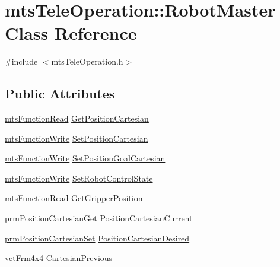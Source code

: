 \hypertarget{classmts_tele_operation_1_1_robot_master}{\section{mts\-Tele\-Operation\-:\-:Robot\-Master Class Reference}
\label{classmts_tele_operation_1_1_robot_master}
}


{\ttfamily \#include $<$mts\-Tele\-Operation.\-h$>$}

\subsection*{Public Attributes}
\begin{DoxyCompactItemize}
\item 
\hyperlink{classmts_function_read}{mts\-Function\-Read} \hyperlink{classmts_tele_operation_1_1_robot_master_a636208133cb0148316c243a9eb0c7cf0}{Get\-Position\-Cartesian}
\item 
\hyperlink{classmts_function_write}{mts\-Function\-Write} \hyperlink{classmts_tele_operation_1_1_robot_master_aa770b7c1b750b7b2afc350b60581f9b2}{Set\-Position\-Cartesian}
\item 
\hyperlink{classmts_function_write}{mts\-Function\-Write} \hyperlink{classmts_tele_operation_1_1_robot_master_aae271d1fcd15f132167f1e0206d5df24}{Set\-Position\-Goal\-Cartesian}
\item 
\hyperlink{classmts_function_write}{mts\-Function\-Write} \hyperlink{classmts_tele_operation_1_1_robot_master_a11e283aec6cec91955b9fc132b6f4bc8}{Set\-Robot\-Control\-State}
\item 
\hyperlink{classmts_function_read}{mts\-Function\-Read} \hyperlink{classmts_tele_operation_1_1_robot_master_ad3791d4ef807b382f9d1f870225d0b65}{Get\-Gripper\-Position}
\item 
\hyperlink{classprm_position_cartesian_get}{prm\-Position\-Cartesian\-Get} \hyperlink{classmts_tele_operation_1_1_robot_master_aa0c188ce05365e7a3a842bb8223eedb5}{Position\-Cartesian\-Current}
\item 
\hyperlink{classprm_position_cartesian_set}{prm\-Position\-Cartesian\-Set} \hyperlink{classmts_tele_operation_1_1_robot_master_a5c1d1ecf363197b5e16e766e186f0273}{Position\-Cartesian\-Desired}
\item 
\hyperlink{vct_transformation_types_8h_a33da47f4deb2556b37a69a2c44b29d75}{vct\-Frm4x4} \hyperlink{classmts_tele_operation_1_1_robot_master_a64a8bdf7b6dc8b6b1dd2ba6eec9fccdf}{Cartesian\-Previous}
\end{DoxyCompactItemize}


